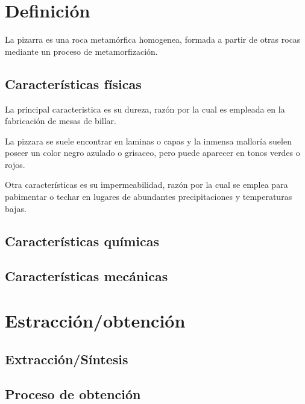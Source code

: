 \section {Definición}
	La pizarra es una roca metamórfica homogenea, formada a partir de otras rocas mediante un proceso de metamorfización.

	\subsection {Características físicas}
	La principal caracteristica es su dureza, razón por la cual es empleada en la fabricación de mesas de billar.

	La pizzara se suele encontrar en laminas o capas y la inmensa malloría suelen poseer un color negro azulado o grisaceo, pero puede aparecer en tonos  verdes o rojos.

	Otra características es su impermeabilidad, razón por la cual se emplea para pabimentar o techar en lugares de abundantes precipitaciones y temperaturas bajas. 
	\subsection {Características químicas}

	\subsection {Características mecánicas}

\section {Estracción/obtención}

	\subsection {Extracción/Síntesis}

	\subsection {Proceso de obtención}

